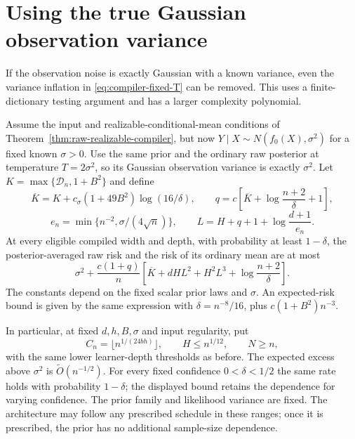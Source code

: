 \section{Using the true Gaussian observation variance}
\label{sec:raw-matched-variance}
If the observation noise is exactly Gaussian with a known variance, even
the variance inflation in \eqref{eq:compiler-fixed-T} can be removed.
This uses a finite-dictionary testing argument and has a larger
complexity polynomial.

\begin{corollary}
\label{cor:raw-compiler-matched}
Assume the input and realizable-conditional-mean conditions of
Theorem~\ref{thm:raw-realizable-compiler}, but now
$Y\mid X\sim N(f_0(X),\sigma^2)$ for a fixed known $\sigma>0$.
Use the same prior and the ordinary raw posterior at temperature
$T=2\sigma^2$, so its Gaussian observation variance is exactly
$\sigma^2$.  Let $K=\max\{\mathcal D_n,1+B^2\}$ and define
\[
 \overline K=K+c_\sigma(1+49B^2)\log(16/\delta),\qquad
 q=c\left[\overline K+\log\frac{n+2}{\delta}+1\right],
\]
\[
 e_n=\min\{n^{-2},\sigma/(4\sqrt n)\},\qquad
 L=H+q+1+\log\frac{d+1}{e_n}.
\]
At every eligible compiled width and depth, with probability at least
$1-\delta$, the posterior-averaged raw risk and the risk of its ordinary
mean are at most
\begin{equation}\label{eq:raw-compiler-matched-bound}
 \sigma^2+\frac{c(1+q)}n
   \left[\overline K+dHL^2+H^2L^3+\log\frac{n+2}{\delta}\right].
\end{equation}
The constants depend on the fixed scalar prior laws and $\sigma$.
An expected-risk bound is given by the same expression with
$\delta=n^{-8}/16$, plus $c(1+B^2)n^{-3}$.

In particular, at fixed $d,h,B,\sigma$ and input regularity, put
\[
 C_n=\lfloor n^{1/(24bh)}\rfloor,\qquad
 H\le n^{1/12},\qquad N\ge n,
\]
with the same lower learner-depth thresholds as before.  The expected
excess above $\sigma^2$ is $\widetilde O(n^{-1/2})$.  For every fixed
confidence $0<\delta<1/2$ the same rate holds with probability
$1-\delta$; the displayed bound retains the dependence for varying
confidence.  The prior family and likelihood variance are fixed.  The architecture
may follow any prescribed schedule in these ranges; once it is prescribed,
the prior has no additional sample-size dependence.
\end{corollary}

